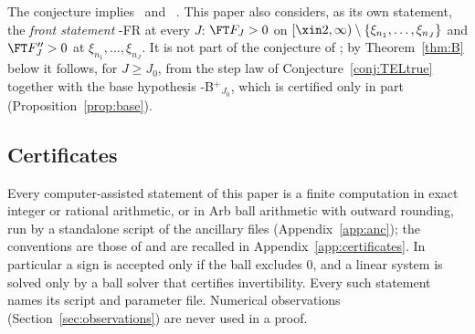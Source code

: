 The conjecture implies \condS\ and \condU\ \cite[Section~6.1]{PaperI}. This paper also considers, as its own statement, the
\emph{front statement} \hyp{FR} at every $J$: $\FT F_J>0$ on $[\xin2,\infty)\setminus\{\xi_{n_1},\dots,\xi_{n_J}\}$ and $\FT F_J''>0$ at
$\xi_{n_1},\dots,\xi_{n_J}$. It is not part of the conjecture of \cite{PaperI}; by Theorem~\ref{thm:B} below it follows, for $J\ge J_0$,
from the step law of Conjecture~\ref{conj:TELtrue} together with the base hypothesis \hyp{B$^+$}$_{J_0}$, which is certified only in
part (Proposition~\ref{prop:base}).

\subsection{Certificates}\label{ssec:setting-cert}

Every computer-assisted statement of this paper is a finite computation in exact integer or rational arithmetic, or in
Arb ball arithmetic \cite{Joh17} with outward rounding, run by a standalone script of the ancillary files
(Appendix~\ref{app:anc}); the conventions are those of \cite{PaperI} and are recalled in Appendix~\ref{app:certificates}. In
particular a sign is accepted only if the ball excludes $0$, and a linear system is solved only by a ball solver that
certifies invertibility. Every such statement names its script and parameter file. Numerical observations
(Section~\ref{sec:observations}) are never used in a proof.
